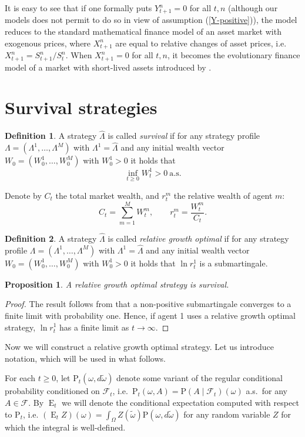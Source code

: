 \documentclass[a4paper,11pt,english]{article}
\newtheorem{proposition}{Proposition}
\theoremstyle{definition}
\newtheorem{definition}{Definition}
\DeclareMathOperator{\E}{E}
\renewcommand{\hat}{\widehat}
\renewcommand{\tilde}{\widetilde}
\renewcommand{\P}{\mathrm{P}}
\newcommand{\F}{\mathcal{F}}
\begin{document}
It is easy to see that if one formally puts $Y_{t+1}^n=0$ for all $t,n$
(although our models does not permit to do so in view of assumption
(\ref{Y-positive})), the model reduces to the standard mathematical finance
model of an asset market with exogenous prices, where $X_{t+1}^n$ are equal
to relative changes of asset prices, i.e. $X_{t+1}^n = S_{t+1}^n / S_t^n$.
When $X_{t+1}^n=0$ for all $t,n$, it becomes the evolutionary finance model
of a market with short-lived assets introduced by \cite{AmirEvstigneev+13}.

\section{Survival strategies}
\begin{definition}
A strategy $\hat \Lambda$ is called \emph{survival} if for any strategy profile
$\Lambda = (\Lambda^{1},\ldots,\Lambda^M)$ with $\Lambda^1 = \hat \Lambda$ and any
initial wealth vector $W_0=(W_0^1,\ldots,W_0^M)$ with $W_0^1 > 0$ it holds that
\[
\inf_{t\ge 0} W_t^1 > 0\ \text{a.s.}
\]
\end{definition}

Denote by $C_t$ the total market wealth, and $r_t^m$ the relative wealth of agent $m$:
\[
C_t = \sum_{m=1}^M W_t^m, \qquad r_t^m = \frac{W_t^m}{C_t}.
\]
\begin{definition}
A strategy $\hat \Lambda$ is called \emph{relative growth optimal} if for any strategy profile
$\Lambda = (\Lambda^{1},\ldots,\Lambda^M)$ with $\Lambda^1 = \hat \Lambda$ and any
initial wealth vector $W_0=(W_0^1,\ldots,W_0^M)$ with $W_0^1 > 0$ it holds that $\ln r_t^1$ is a submartingale.
\end{definition}

\begin{proposition}
A relative growth optimal strategy is survival.
\end{proposition}
\begin{proof}
The result follows from that a non-positive submartingale converges to a finite limit with probability one. Hence, if agent 1 uses a relative growth optimal strategy, $\ln r_t^1$ has a finite limit as $t\to\infty$.
\end{proof}

Now we will construct a relative growth optimal strategy. Let us introduce 
notation, which will be used in what follows.

For each $t\ge 0$, let $\P_t(\omega, d\tilde \omega)$ denote
some variant of the regular conditional probability conditioned on $\F_t$,
i.e.\ $\P_t(\omega, A) = \P(A \mid \F_t)(\omega)$ a.s.\ 
for any $A\in \F$. By $\E_t$ we will denote the conditional expectation
computed with respect to $\P_t$, i.e. $(\E_t Z)(\omega) = \int_\Omega Z(\tilde \omega)
\P(\omega, d\tilde \omega)$ for any random variable $Z$ for which the
integral is well-defined.
\end{document}
